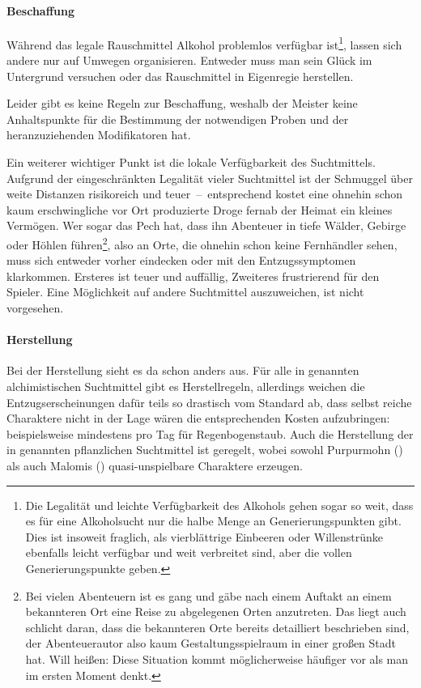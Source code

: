 \paragraph{Beschaffung}
Während das legale Rauschmittel Alkohol problemlos verfügbar ist\footnote{Die Legalität und leichte Verfügbarkeit des Alkohols gehen sogar so weit, dass es für eine Alkoholsucht nur die halbe Menge an Generierungspunkten gibt. Dies ist insoweit fraglich, als vierblättrige Einbeeren oder Willenstrünke ebenfalls leicht verfügbar und weit verbreitet sind, aber die vollen Generierungspunkte geben.}, lassen sich andere nur auf Umwegen organisieren. Entweder muss man sein Glück im Untergrund versuchen oder das Rauschmittel in Eigenregie herstellen.

Leider gibt es keine Regeln zur Beschaffung, weshalb der Meister keine Anhaltspunkte für die Bestimmung der notwendigen Proben und der heranzuziehenden Modifikatoren hat.

Ein weiterer wichtiger Punkt ist die lokale Verfügbarkeit des Suchtmittels. Aufgrund der eingeschränkten Legalität vieler Suchtmittel ist der Schmuggel über weite Distanzen risikoreich und teuer~--~entsprechend kostet eine ohnehin schon kaum erschwingliche vor Ort produzierte Droge fernab der Heimat ein kleines Vermögen. Wer sogar das Pech hat, dass ihn Abenteuer in tiefe Wälder, Gebirge oder Höhlen führen\footnote{Bei vielen Abenteuern ist es gang und gäbe nach einem Auftakt an einem bekannteren Ort eine Reise zu abgelegenen Orten anzutreten. Das liegt auch schlicht daran, dass die bekannteren Orte bereits detailliert beschrieben sind, der Abenteuerautor also kaum Gestaltungsspielraum in einer großen Stadt hat. Will heißen: Diese Situation kommt möglicherweise häufiger vor als man im ersten Moment denkt.}, also an Orte, die ohnehin schon keine Fernhändler sehen, muss sich entweder vorher eindecken oder mit den Entzugssymptomen klarkommen. Ersteres ist teuer und auffällig, Zweiteres frustrierend für den Spieler. Eine Möglichkeit auf andere Suchtmittel auszuweichen, ist nicht vorgesehen.

\paragraph{Herstellung}
Bei der Herstellung sieht es da schon anders aus. Für alle in  genannten alchimistischen Suchtmittel gibt es Herstellregeln, allerdings weichen die Entzugserscheinungen dafür teils so drastisch vom Standard ab, dass selbst reiche Charaktere nicht in der Lage wären die entsprechenden Kosten aufzubringen: beispielsweise mindestens  pro Tag für Regenbogenstaub. Auch die Herstellung der in  genannten pflanzlichen Suchtmittel ist geregelt, wobei sowohl Purpurmohn () als auch Malomis () quasi-unspielbare Charaktere erzeugen.

